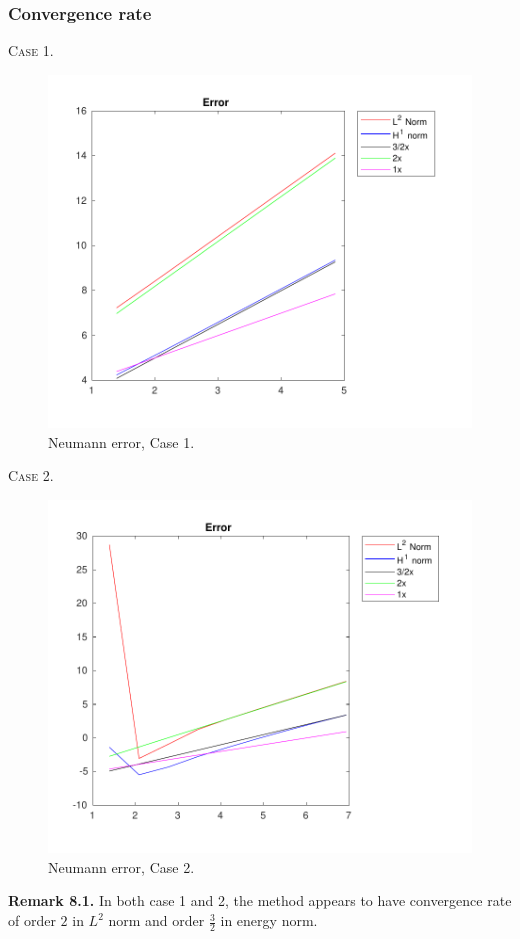 \documentclass[a4paper]{article}
\numberwithin{equation}{section}
\begin{document}
\subsubsection{Convergence rate}
\textsc{Case 1.}
\begin{figure}[H]
\centering\includegraphics[width=13.5cm]{fig_neumann_error_G1_CP1_I1_M6_C1}
\caption{Neumann error, Case 1.}
\end{figure}
\newpage
\noindent
\textsc{Case 2.}
\begin{figure}[H]
\centering\includegraphics[width=13.5cm]{fig_neumann_error_G1_CP1_I1_M9_C2}
\caption{Neumann error, Case 2.}
\end{figure}
\noindent\textbf{Remark 8.1.} In both case 1 and 2, the method appears to have convergence rate of order $2$ in $L^2$ norm and order $\frac{3}{2}$ in energy norm.
\end{document}
